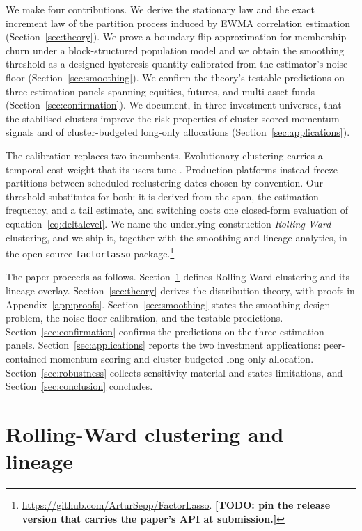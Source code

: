 \documentclass[11pt]{article}
\theoremstyle{remark}
\newcommand{\TODO}[1]{\textbf{[TODO: #1]}}
\begin{document}
We make four contributions. We derive the stationary law and the exact
increment law of the partition process induced by EWMA correlation estimation
(Section~\ref{sec:theory}). We prove a boundary-flip approximation for
membership churn under a block-structured population model and we obtain the
smoothing threshold as a designed hysteresis quantity calibrated from the
estimator's noise floor (Section~\ref{sec:smoothing}). We confirm the theory's
testable predictions on three estimation panels spanning equities, futures, and
multi-asset funds (Section~\ref{sec:confirmation}). We document, in three
investment universes, that the stabilised clusters improve the risk properties
of cluster-scored momentum signals and of cluster-budgeted long-only
allocations (Section~\ref{sec:applications}).

The calibration replaces two incumbents. Evolutionary clustering carries a
temporal-cost weight that its users tune \citep{chakrabarti2006evolutionary,
xu2014adaptive}. Production platforms instead freeze partitions between
scheduled reclustering dates chosen by convention. Our threshold substitutes
for both: it is derived from the span, the estimation frequency, and a tail
estimate, and switching costs one closed-form evaluation of
equation~\eqref{eq:deltalevel}. We name the underlying construction
\emph{Rolling-Ward} clustering, and we ship it, together with the smoothing
and lineage analytics, in the open-source \texttt{factorlasso}
package.\footnote{\url{https://github.com/ArturSepp/FactorLasso}.
\TODO{pin the release version that carries the paper's API at submission.}}

The paper proceeds as follows. Section~\ref{sec:rollingward} defines
Rolling-Ward clustering and its lineage overlay. Section~\ref{sec:theory}
derives the distribution theory, with proofs in
Appendix~\ref{app:proofs}. Section~\ref{sec:smoothing} states the smoothing
design problem, the noise-floor calibration, and the testable predictions.
Section~\ref{sec:confirmation} confirms the predictions on the three
estimation panels. Section~\ref{sec:applications} reports the two investment
applications: peer-contained momentum scoring and cluster-budgeted long-only
allocation. Section~\ref{sec:robustness} collects sensitivity material and
states limitations, and Section~\ref{sec:conclusion} concludes.

\section{Rolling-Ward clustering and lineage}
\label{sec:rollingward}
\end{document}
